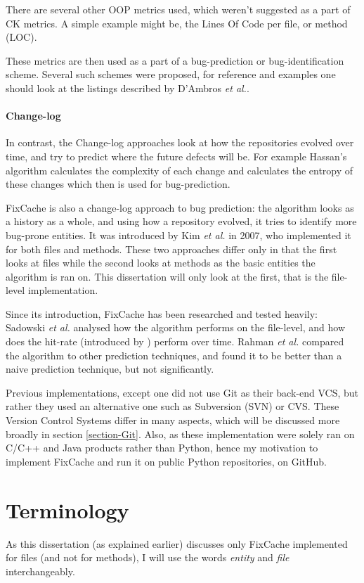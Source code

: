 \documentclass[12pt,twoside,notitlepage]{report}
\newcommand{\fxch}{FixCache}
\newcommand{\etal}{\textit{et al.}}
\begin{document}
There are several other OOP metrics used, which weren't suggested as a part of CK metrics. A simple example might be, the Lines Of Code per file, or method (LOC).

These metrics are then used as a part of a bug-prediction or bug-identification scheme. Several such schemes were proposed, for reference and examples one should look at the listings described by D'Ambros \textit{et al.}\cite{5463279}.

\paragraph{Change-log}In contrast, the Change-log approaches look at how the repositories evolved over time, and try to predict where the future defects will be. For example Hassan's algorithm calculates the complexity of each change and calculates the entropy of these changes which then is used for bug-prediction\cite{hassan}.

\fxch{} is also a change-log approach to bug prediction: the algorithm looks as a history as a whole, and using how a repository evolved, it tries to identify more bug-prone entities. It was introduced by Kim \textit{et al.} in 2007\cite{FixCache}, who implemented it for both files and methods. These two approaches differ only in that the first looks at files while the second looks at methods as the basic entities the algorithm is ran on. This dissertation will only look at the first, that is the file-level implementation.

Since its introduction, \fxch{} has been researched and tested heavily: Sadowski \etal{}\cite{Sadowski} analysed how the algorithm performs on the file-level, and how does the hit-rate (introduced by \cite{FixCache}) perform over time. Rahman \etal{}\cite{Bugcache} compared the algorithm to other prediction techniques, and found it to be better than a naive prediction technique, but not significantly.

Previous implementations\cite{FixCache}\cite{Sadowski}, except one\cite{Bugcache} did not use Git\cite{TorvaldsGit} as their back-end VCS, but rather they used an alternative one such as Subversion (SVN) or CVS. These Version Control Systems differ in many aspects, which will be discussed more broadly in section \ref{section-Git}. Also, as these implementation were solely ran on C/C++ and Java products rather than Python, hence my motivation to implement \fxch{} and run it on public Python repositories, on GitHub.
\section{Terminology}
As this dissertation (as explained earlier) discusses only \fxch{} implemented for files (and not for methods), I will use the words \textit{entity} and \textit{file} interchangeably.
\end{document}
